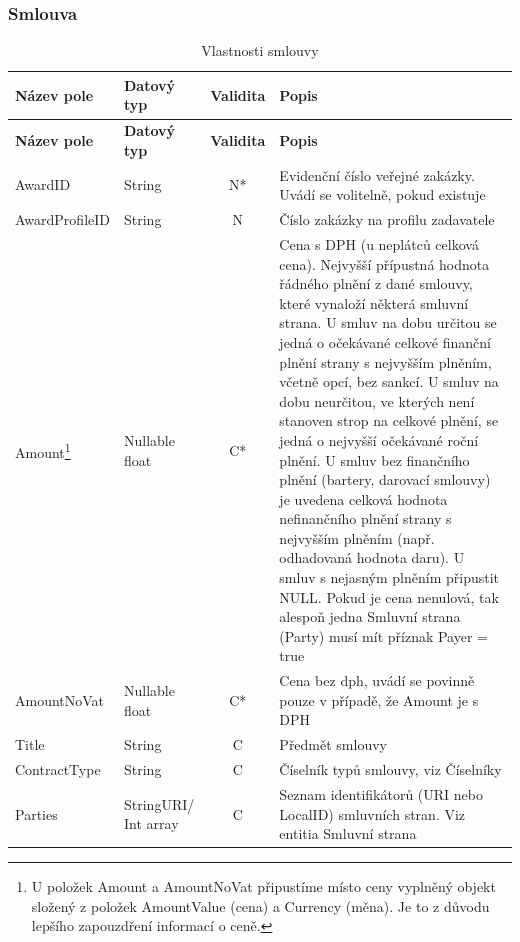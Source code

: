 \subsubsection*{Smlouva}

\begin{center}
\begin{longtable}{lp{20mm}cp{65mm}}
\label{grid_mlmmh} \\
\multicolumn{1}{l}{\textbf{Název pole}} & 
\multicolumn{1}{l}{\textbf{Datový typ}} & 
\multicolumn{1}{l}{\textbf{Validita}} & 
\multicolumn{1}{l}{\textbf{Popis}} \\ \hline 
\endfirsthead
\multicolumn{1}{l}{\textbf{Název pole}} & 
\multicolumn{1}{l}{\textbf{Datový typ}} & 
\multicolumn{1}{l}{\textbf{Validita}} & 
\multicolumn{1}{l}{\textbf{Popis}} \\ \hline 
\hline
\endhead
\endfoot
\caption{Vlastnosti smlouvy}
\endlastfoot
AwardID & String & N* & Evidenční číslo veřejné zakázky. Uvádí se volitelně, pokud existuje \\
AwardProfileID & String & N & Číslo zakázky na profilu zadavatele \\
\rowcolor{validateC}Amount\footnote{U položek Amount a AmountNoVat připustíme místo ceny vyplněný objekt složený z položek AmountValue (cena) a Currency (měna). Je to z důvodu lepšího zapouzdření informací o ceně.} & Nullable float & C* & Cena s DPH (u neplátců celková cena). Nejvyšší přípustná hodnota řádného plnění z dané smlouvy, které vynaloží některá smluvní strana. U smluv na dobu určitou se jedná o očekávané celkové finanční plnění strany s nejvyšším plněním, včetně opcí, bez sankcí. U smluv na dobu neurčitou, ve kterých není stanoven strop na celkové plnění, se jedná o nejvyšší očekávané roční plnění. U smluv bez finančního plnění (bartery, darovací smlouvy) je uvedena celková hodnota nefinančního plnění strany s nejvyšším plněním (např. odhadovaná hodnota daru). U smluv s nejasným plněním připustit NULL. Pokud je cena nenulová, tak alespoň jedna Smluvní strana (Party) musí mít příznak Payer = true \\
\rowcolor{validateC}AmountNoVat & Nullable float & C* & Cena bez dph, uvádí se povinně pouze v případě, že Amount je s DPH \\
\rowcolor{validateC}Title & String & C & Předmět smlouvy \\
\rowcolor{validateC}ContractType & String & C & Číselník typů smlouvy, viz Číselníky \\
\rowcolor{validateC}Parties & StringURI/ Int array & C & Seznam identifikátorů (URI nebo LocalID) smluvních stran. Viz entitia Smluvní strana \\

\end{longtable}
\end{center}
